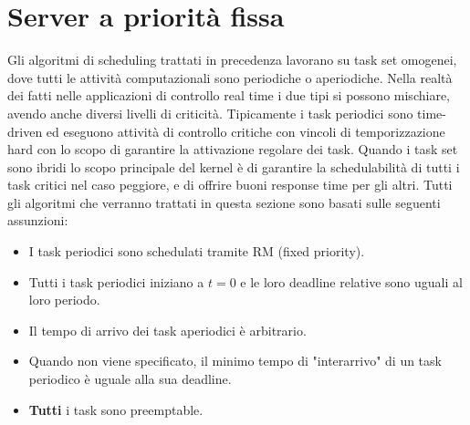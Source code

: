 \documentclass[12pt]{article}
\begin{document}
\section{Server a priorità fissa}
Gli algoritmi di scheduling trattati in precedenza lavorano su task set omogenei, dove tutti le attività computazionali sono periodiche o aperiodiche.
Nella realtà dei fatti nelle applicazioni di controllo real time i due tipi si possono mischiare, avendo anche diversi livelli di criticità.
Tipicamente i task periodici sono time-driven ed eseguono attività di controllo critiche con vincoli di temporizzazione hard con lo scopo di garantire la attivazione regolare dei task.
Quando i task set sono ibridi lo scopo principale del kernel è di garantire la schedulabilità di tutti i task critici nel caso peggiore, e di offrire buoni response time per gli altri.
Tutti gli algoritmi che verranno trattati in questa sezione sono basati sulle seguenti assunzioni:
\begin{itemize}
    \item I task periodici sono schedulati tramite RM (fixed priority).
    \item Tutti i task periodici iniziano a $t=0$ e le loro deadline relative sono uguali al loro periodo.
    \item Il tempo di arrivo dei task aperiodici è arbitrario.
    \item Quando non viene specificato, il minimo tempo di "interarrivo" di un task periodico è uguale alla sua deadline.
    \item \textbf{Tutti} i task sono preemptable.
\end{itemize}
\end{document}
